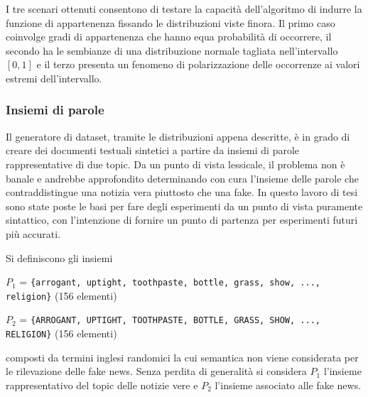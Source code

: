\documentclass[12pt]{report}
\theoremstyle{definition}
\begin{document}
I tre scenari ottenuti consentono di testare la capacità dell'algoritmo di indurre la funzione di appartenenza fissando le distribuzioni viste finora. Il primo caso coinvolge gradi di appartenenza che hanno equa probabilità di occorrere, il secondo ha le sembianze di una distribuzione normale tagliata nell'intervallo $[0,1]$ e il terzo presenta un fenomeno di polarizzazione delle occorrenze ai valori estremi dell'intervallo.

\subsubsection{Insiemi di parole} Il generatore di dataset, tramite le distribuzioni appena descritte, è in grado di creare dei documenti testuali sintetici a partire da insiemi di parole rappresentative di due topic.
Da un punto di vista lessicale, il problema non è banale e andrebbe approfondito determinando con cura l'insieme delle parole che contraddistingue una notizia vera piuttosto che una fake.
In questo lavoro di tesi sono state poste le basi per fare degli esperimenti da un punto di vista puramente sintattico, con l'intenzione di fornire un punto di partenza per esperimenti futuri più accurati.

Si definiscono gli insiemi
\begin{center}
    $P_1$ = \texttt{\{arrogant, uptight, toothpaste, bottle, grass, show, ..., religion\}} (156 elementi)
\end{center}
\begin{center}
    $P_2$ = \texttt{\{ARROGANT, UPTIGHT, TOOTHPASTE, BOTTLE, GRASS, SHOW, ..., RELIGION\}} (156 elementi)
\end{center}
composti da termini inglesi randomici la cui semantica non viene considerata per le rilevazione delle fake news. Senza perdita di generalità si considera $P_1$ l'insieme rappresentativo del topic delle notizie vere e $P_2$ l'insieme associato alle fake news.
\end{document}
